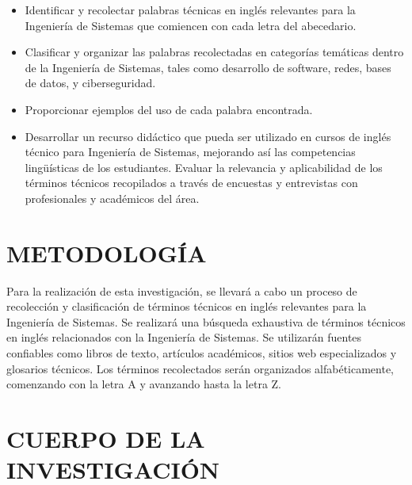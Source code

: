         \begin{itemize}
            \item Identificar y recolectar palabras técnicas en inglés relevantes para la Ingeniería de Sistemas que comiencen con cada letra del abecedario. 
            \item Clasificar y organizar las palabras recolectadas en categorías temáticas dentro de la Ingeniería de Sistemas, tales como desarrollo de software, redes, bases de datos, y ciberseguridad. 
            \item Proporcionar ejemplos del uso de cada palabra encontrada.
            \item Desarrollar un recurso didáctico que pueda ser utilizado en cursos de inglés técnico para Ingeniería de Sistemas, mejorando así las competencias lingüísticas de los estudiantes. Evaluar la relevancia y aplicabilidad de los términos técnicos recopilados a través de encuestas y entrevistas con profesionales y académicos del área.
        \end{itemize}

\section{METODOLOGÍA}

    Para la realización de esta investigación, se llevará a cabo un proceso de recolección y clasificación de términos técnicos en inglés relevantes para la Ingeniería de Sistemas. Se realizará una búsqueda exhaustiva de términos técnicos en inglés relacionados con la Ingeniería de Sistemas. Se utilizarán fuentes confiables como libros de texto, artículos académicos, sitios web especializados y glosarios técnicos. Los términos recolectados serán organizados alfabéticamente, comenzando con la letra A y avanzando hasta la letra Z.

\section{CUERPO DE LA INVESTIGACIÓN}

